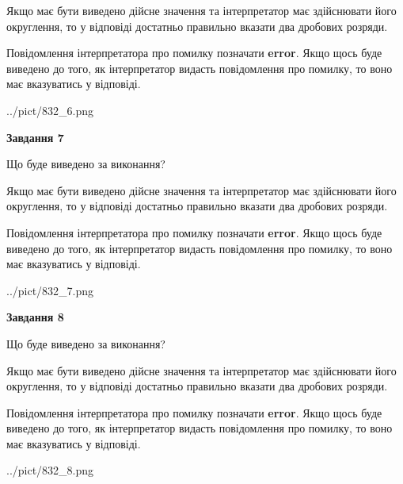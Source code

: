\documentclass[12pt, ukrainian]{article}
\begin{document}
{\begin {Large}
Якщо має бути виведено дійсне значення та інтерпретатор має здійснювати його округлення, 
то у відповіді достатньо правильно вказати два дробових розряди.

Повідомлення інтерпретатора про помилку позначати \textbf{error}.
Якщо щось буде виведено до того, як інтерпретатор видасть повідомлення про помилку, 
то воно має вказуватись у відповіді. \par

\begin{center}
	{../pict/832_6.png}
\end{center}
\newpage

{\begin {center}\textbf{Завдання 7}\end {center}}\par
Що буде виведено за виконання? \par

Якщо має бути виведено дійсне значення та інтерпретатор має здійснювати його округлення, 
то у відповіді достатньо правильно вказати два дробових розряди.

Повідомлення інтерпретатора про помилку позначати \textbf{error}.
Якщо щось буде виведено до того, як інтерпретатор видасть повідомлення про помилку, 
то воно має вказуватись у відповіді. \par

\begin{center}
	{../pict/832_7.png}
\end{center}
\newpage

{\begin {center}\textbf{Завдання 8}\end {center}}\par
Що буде виведено за виконання? \par

Якщо має бути виведено дійсне значення та інтерпретатор має здійснювати його округлення, 
то у відповіді достатньо правильно вказати два дробових розряди.

Повідомлення інтерпретатора про помилку позначати \textbf{error}.
Якщо щось буде виведено до того, як інтерпретатор видасть повідомлення про помилку, 
то воно має вказуватись у відповіді. \par

\begin{center}
	{../pict/832_8.png}
\end{center}
\newpage


\end{Large}}
\end{document}
